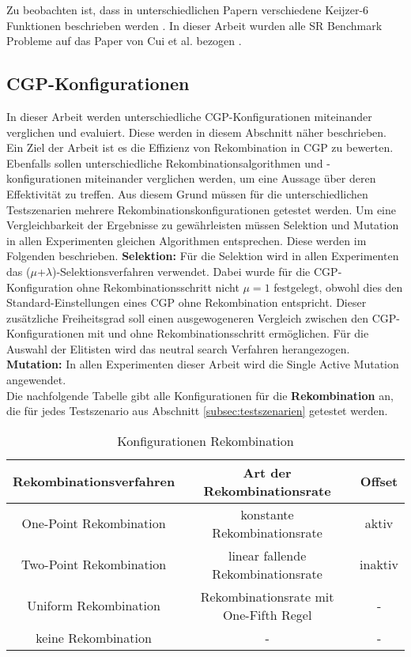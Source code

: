 Zu beobachten ist, dass in unterschiedlichen Papern verschiedene Keijzer-6 Funktionen beschrieben werden \cite{oliveira_analysing_2018, li_generative_2024, kommenda_local_2018}. 
In dieser Arbeit wurden alle SR Benchmark Probleme auf das Paper von Cui et al. bezogen \cite{affenzeller_positional_2024}.

\subsection{CGP-Konfigurationen}
\label{subsec:CGPkonfigurationen}

In dieser Arbeit werden unterschiedliche CGP-Konfigurationen miteinander verglichen und evaluiert. Diese werden in diesem Abschnitt näher beschrieben.\\
Ein Ziel der Arbeit ist es die Effizienz von Rekombination in CGP zu bewerten.
Ebenfalls sollen unterschiedliche Rekombinationsalgorithmen und -konfigurationen miteinander verglichen werden, um eine Aussage über deren Effektivität zu treffen.
Aus diesem Grund müssen für die unterschiedlichen Testszenarien mehrere Rekombinationskonfigurationen getestet werden.
Um eine Vergleichbarkeit der Ergebnisse zu gewährleisten müssen Selektion und Mutation in allen Experimenten gleichen Algorithmen entsprechen.
Diese werden im Folgenden beschrieben.\newline
\textbf{Selektion:} Für die Selektion wird in allen Experimenten das ($\mu$+$\lambda$)-Selektionsverfahren verwendet.
Dabei wurde für die CGP-Konfiguration ohne Rekombinationsschritt nicht $\mu = 1$ festgelegt, obwohl dies den Standard-Einstellungen eines CGP ohne Rekombination entspricht.
Dieser zusätzliche Freiheitsgrad soll einen ausgewogeneren Vergleich zwischen den CGP-Konfigurationen mit und ohne Rekombinationsschritt ermöglichen.
Für die Auswahl der Elitisten wird das neutral search Verfahren herangezogen.\\
\textbf{Mutation:} In allen Experimenten dieser Arbeit wird die Single Active Mutation angewendet.\\

Die nachfolgende Tabelle gibt alle Konfigurationen für die \textbf{Rekombination} an, die für jedes Testszenario aus Abschnitt \ref{subsec:testszenarien} getestet werden.

\begin{table}[h]
	\centering
	\begin{tabular}{c | c | c}
		\textbf{Rekombinationsverfahren} & \textbf{Art der Rekombinationsrate} & \textbf{Offset}\\
		\hline
		One-Point Rekombination & konstante Rekombinationsrate  & aktiv \\
		\hline
		Two-Point Rekombination & linear fallende Rekombinationsrate & inaktiv \\
		\hline
		Uniform Rekombination & Rekombinationsrate mit One-Fifth Regel & - \\
		\hline
		keine Rekombination &  - &  - \\
	\end{tabular}
	\caption{Konfigurationen Rekombination}
	\label{table:Rekombinationskonfigurationen}
\end{table}

